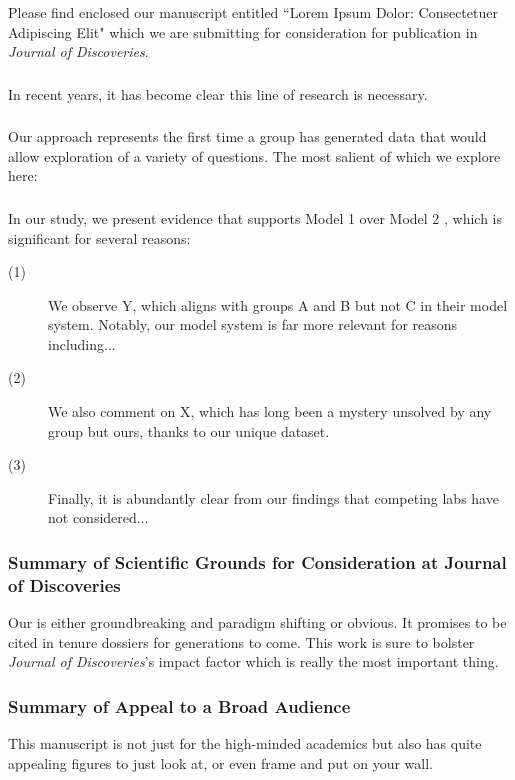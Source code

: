 \documentclass[11pt]{article}
\newcommand{\journalname}{Journal of Discoveries} %
\begin{document}
\noindent Please find enclosed our manuscript entitled ``Lorem Ipsum Dolor: Consectetuer Adipiscing Elit" which we are submitting for consideration for publication in \textit{\journalname}.

\subsubsection{}
\noindent In recent years, it has become clear this line of research is necessary. \lipsum[1] 

\subsubsection{}
\noindent Our approach represents the first time a group has generated data that would allow exploration of a variety of questions. The most salient of which we explore here: 

\subsubsection{}
In our study, we present evidence that supports Model 1  over Model 2 , which is significant for several reasons:

\begin{description}
  \item[(1)] We observe Y, which aligns with groups A and B but not C in their model system. Notably, our model system is far more relevant for reasons including...
  \item[(2)] We also comment on X, which has long been a mystery unsolved by any group but ours, thanks to our unique dataset.
  \item[(3)] Finally, it is abundantly clear from our findings that competing labs have not considered...
\end{description}

\subsubsection*{Summary of Scientific Grounds for Consideration at \journalname}
\noindent Our is either groundbreaking and paradigm shifting or obvious. It promises to be cited in tenure dossiers for generations to come. This work is sure to bolster \textit{\journalname}'s impact factor which is really the most important thing. 

\subsubsection*{Summary of Appeal to a Broad Audience}
\noindent This manuscript is not just for the high-minded academics but also has quite appealing figures to just look at, or even frame and put on your wall.
\end{document}
